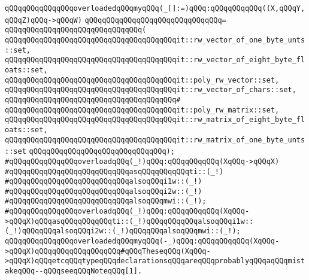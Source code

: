 \verb|qQQqqQQqqQQqqQQqoverloadedqQQqmyqQQq(_[]:=)qQQq:qQQqqQQqqQQq((X,qQQqY,qQQqZ)qQQq->qQQqW)|\newline
\verb|qQQqqQQqqQQqqQQqqQQqqQQqqQQqqQQq=|\newline
\verb|qQQqqQQqqQQqqQQqqQQqqQQqqQQqqQQq(|\newline
\verb|qQQqqQQqqQQqqQQqqQQqqQQqqQQqqQQqqQQqqQQqit::rw_vector_of_one_byte_unts::set,|\newline
\verb|qQQqqQQqqQQqqQQqqQQqqQQqqQQqqQQqqQQqqQQqit::rw_vector_of_eight_byte_floats::set,|\newline
\verb|qQQqqQQqqQQqqQQqqQQqqQQqqQQqqQQqqQQqqQQqit::poly_rw_vector::set,|\newline
\verb|qQQqqQQqqQQqqQQqqQQqqQQqqQQqqQQqqQQqqQQqit::rw_vector_of_chars::set,|\newline
\verb|qQQqqQQqqQQqqQQqqQQqqQQqqQQqqQQqqQQqqQQq#|\newline
\verb|qQQqqQQqqQQqqQQqqQQqqQQqqQQqqQQqqQQqqQQqit::poly_rw_matrix::set,|\newline
\verb|qQQqqQQqqQQqqQQqqQQqqQQqqQQqqQQqqQQqqQQqit::rw_matrix_of_eight_byte_floats::set,|\newline
\verb|qQQqqQQqqQQqqQQqqQQqqQQqqQQqqQQqqQQqqQQqit::rw_matrix_of_one_byte_unts::set|\newline
\verb|qQQqqQQqqQQqqQQqqQQqqQQqqQQqqQQq);|\newline
\newline
\newline
\newline
\newline
\verb|#qQQqqQQqqQQqqQQqoverloadqQQq(_!)qQQq:qQQqqQQqqQQq(XqQQq->qQQqX)|\newline
\verb|#qQQqqQQqqQQqqQQqqQQqqQQqqQQqasqQQqqQQqqQQqti::(_!)|\newline
\verb|#qQQqqQQqqQQqqQQqqQQqqQQqqQQqalsoqQQqi1w::(_!)|\newline
\verb|#qQQqqQQqqQQqqQQqqQQqqQQqqQQqalsoqQQqi2w::(_!)|\newline
\verb|#qQQqqQQqqQQqqQQqqQQqqQQqqQQqalsoqQQqmwi::(_!);|\newline
\newline
\verb|#qQQqqQQqqQQqqQQqoverloadqQQq(_!)qQQq:qQQqqQQqqQQq(XqQQq->qQQqX)qQQqasqQQqqQQqqQQqti::(_!)qQQqqQQqqQQqalsoqQQqi1w::(_!)qQQqqQQqalsoqQQqi2w::(_!)qQQqqQQqalsoqQQqmwi::(_!);|\newline
\newline
\verb|qQQqqQQqqQQqqQQqoverloadedqQQqmyqQQq(-_)qQQq:qQQqqQQqqQQq(XqQQq->qQQqX)qQQqqQQqqQQqqQQqqQQq#qQQqTheseqQQq(XqQQq->qQQqX)qQQqetcqQQqtypeqQQqdeclarationsqQQqareqQQqprobablyqQQqaqQQqmistakeqQQq--qQQqseeqQQqNoteqQQq[1].|\newline
